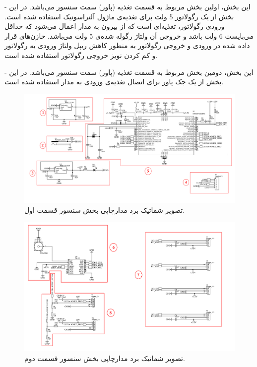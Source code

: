 - این بخش، اولین بخش مربوط به قسمت تغذیه (پاور) سمت سنسور می‌‌باشد. در این بخش از یک رگولاتور 5 ولت برای تغذیه‌‌ی ماژول آلتراسونیک استفاده شده است. ورودی رگولاتور، تغذیه‌ای است که از بیرون به مدار اعمال می‌شود که حداقل می‌بایست 6 ولت باشد و خروجی آن ولتاژ رگوله شده‌ی 5 ولت می‌باشد. خازن‌های قرار داده شده در ورودی و خروجی رگولاتور به منظور کاهش ریپل ولتاژ ورودی به رگولاتور و کم کردن نویز خروجی رگولاتور استفاده شده است. 

- این بخش، دومین بخش مربوط به قسمت تغذیه (پاور) سمت سنسور می‌باشد. در این بخش از یک جک پاور برای اتصال تغذیه‌ی ورودی به مدار استفاده شده است.

\begin{figure}[H]
	\includegraphics[width=\linewidth]{Assets/Schematic_Transmiter1.png}
	\caption{ تصویر شماتیک برد مدارچاپی بخش سنسور قسمت اول.}
	\label{fig:SchematicTransmiter1}
\end{figure}

\begin{figure}[H]
	\includegraphics[width=\linewidth]{Assets/Schematic_Transmiter2.png}
	\caption{ تصویر شماتیک برد مدارچاپی بخش سنسور قسمت دوم.}
	\label{fig:SchematicTransmiter2}
\end{figure}


